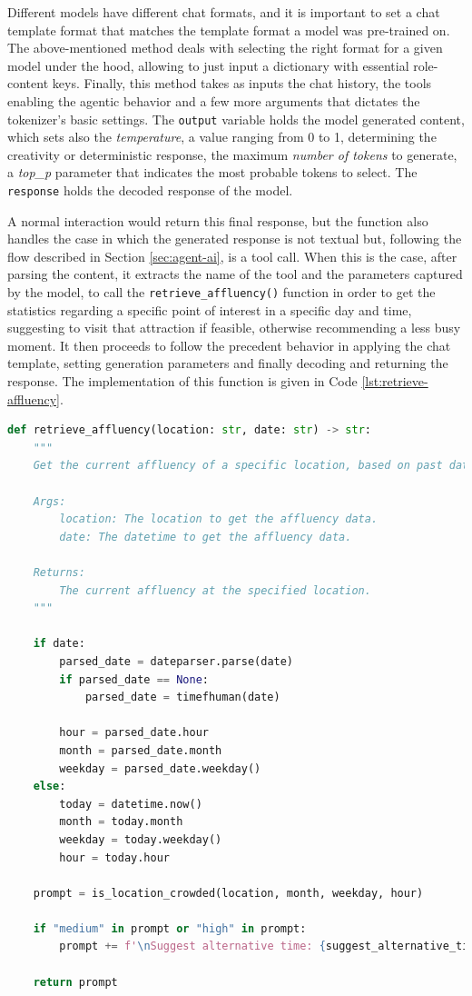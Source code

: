 Different models have different chat formats, and it is important to set a chat template format that matches the template format a model was pre-trained on. The above-mentioned method deals with selecting the right format for a given model under the hood, allowing to just input a dictionary with essential role-content keys.
Finally, this method takes as inputs the chat history, the tools enabling the agentic behavior and a few more arguments that dictates the tokenizer's basic settings.
The \texttt{output} variable holds the model generated content, which sets also the \textit{temperature}, a value ranging from 0 to 1, determining the creativity or deterministic response, the maximum \textit{number of tokens} to generate, a \textit{top\_p} parameter that indicates the most probable tokens to select. The \texttt{response} holds the decoded response of the model.

A normal interaction would return this final response, but the function also handles the case in which the generated response is not textual but, following the flow described in Section \ref{sec:agent-ai}, is a tool call. When this is the case, after parsing the content, it extracts the name of the tool and the parameters captured by the model, to call the \texttt{retrieve\_affluency()} function in order to get the statistics regarding a specific point of interest in a specific day and time, suggesting to visit that attraction if feasible, otherwise recommending a less busy moment. It then proceeds to follow the precedent behavior in applying the chat template, setting generation parameters and finally decoding and returning the response. The implementation of this function is given in Code \ref{lst:retrieve-affluency}.

\begin{center}
\begin{lstlisting}[language=Python, frame=single, caption=\texttt{retrieve\_affluency()} Function.]
def retrieve_affluency(location: str, date: str) -> str:
    """
    Get the current affluency of a specific location, based on past data.

    Args:
        location: The location to get the affluency data.
        date: The datetime to get the affluency data.

    Returns:
        The current affluency at the specified location.
    """

    if date:
        parsed_date = dateparser.parse(date)
        if parsed_date == None:
            parsed_date = timefhuman(date)

        hour = parsed_date.hour
        month = parsed_date.month
        weekday = parsed_date.weekday()
    else:
        today = datetime.now()
        month = today.month
        weekday = today.weekday()
        hour = today.hour

    prompt = is_location_crowded(location, month, weekday, hour)

    if "medium" in prompt or "high" in prompt:
        prompt += f'\nSuggest alternative time: {suggest_alternative_time(location, month, weekday)}.'

    return prompt
\end{lstlisting}
\label{lst:retrieve-affluency}
\end{center}

